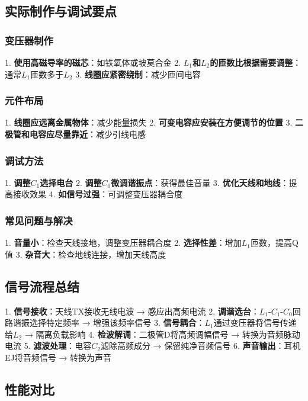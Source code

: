 \documentclass[12pt,UTF8]{ctexbook}
\begin{document}
\subsection{实际制作与调试要点}

\subsubsection{变压器制作}
1. \textbf{使用高磁导率的磁芯}：如铁氧体或坡莫合金
2. \textbf{$L_1$和$L_2$的匝数比根据需要调整}：通常$L_1$匝数多于$L_2$
3. \textbf{线圈应紧密绕制}：减少匝间电容

\subsubsection{元件布局}
1. \textbf{线圈应远离金属物体}：减少能量损失
2. \textbf{可变电容应安装在方便调节的位置}
3. \textbf{二极管和电容应尽量靠近}：减少引线电感

\subsubsection{调试方法}
1. \textbf{调整$C_1$选择电台}
2. \textbf{调整$C_0$微调谐振点}：获得最佳音量
3. \textbf{优化天线和地线}：提高接收效果
4. \textbf{如信号过强}：可调整变压器耦合度

\subsubsection{常见问题与解决}
1. \textbf{音量小}：检查天线接地，调整变压器耦合度
2. \textbf{选择性差}：增加$L_1$匝数，提高Q值
3. \textbf{杂音大}：检查地线连接，增加天线高度

\subsection{信号流程总结}

1. \textbf{信号接收}：天线TX接收无线电波 → 感应出高频电流
2. \textbf{调谐选台}：$L_1$-$C_1$-$C_0$回路谐振选择特定频率 → 增强该频率信号
3. \textbf{信号耦合}：$L_1$通过变压器将信号传递给$L_2$ → 隔离负载影响
4. \textbf{检波解调}：二极管D将高频调幅信号 → 转换为音频脉动电流
5. \textbf{滤波处理}：电容$C_2$滤除高频成分 → 保留纯净音频信号
6. \textbf{声音输出}：耳机EJ将音频信号 → 转换为声音

\subsection{性能对比}
\end{document}
